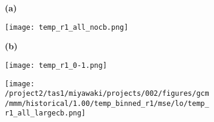 \documentclass[preview]{standalone}
\begin{document}
\begin{figure}
  \begin{subfigure}[t]{0.05\textwidth}
    \textbf{\normalsize{(a)}}
  \end{subfigure}
  \begin{subfigure}[t]{0.45\textwidth}
    \texttt{[image: temp\_r1\_all\_nocb.png]}
  \end{subfigure}
  \begin{subfigure}[t]{0.05\textwidth}
    \textbf{\normalsize{(b)}}
  \end{subfigure}
  \begin{subfigure}[t]{0.45\textwidth}
    \texttt{[image: temp\_r1\_0-1.png]}
  \end{subfigure}
  
  \begin{subfigure}[t]{\textwidth}
    \texttt{[image: /project2/tas1/miyawaki/projects/002/figures/gcm/mmm/historical/1.00/temp\_binned\_r1/mse/lo/temp\_r1\_all\_largecb.png]}
  \end{subfigure}
  
\end{figure}
\end{document}
